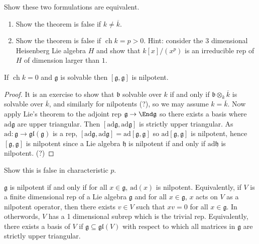 \documentclass[a4paper]{article}
\newcommand*{\Lie}[1]{\mathfrak{#1}} %
\newcommand{\ad}{\mathrm{ad}} %
\DeclareMathOperator{\cha}{ch} %
\begin{document}
\begin{ex}
  Show these two formulations are equivalent.
\end{ex}

\begin{ex}\leavevmode
  \begin{enumerate}
  \item Show the theorem is false if \(k \neq \overline k\).
  \item Show the theorem is false if \(\cha k = p > 0\). Hint: consider the 3 dimensional Heisenberg Lie algebra \(H\) and show that \(k[x]/(x^p)\) is an irreducible rep of \(H\) of dimension larger than \(1\).
  \end{enumerate}
\end{ex}

\begin{corollary}
  If \(\cha k = 0\) and \(\Lie g\) is solvable then \([\Lie g, \Lie g]\) is nilpotent.
\end{corollary}

\begin{proof}
  It is an exercise to show that \(\Lie b\) solvable over \(k\) if and only if \(\Lie b \otimes_k \overline k\) is solvable over \(\overline k\), and similarly for nilpotents (?), so we may assume \(k = \overline k\). Now apply Lie's theorem to the adjoint rep \(\Lie g \to \End \Lie g\) so there exists a basis where \(\ad \Lie g\) are upper triangular. Then \([\ad \Lie g, \ad \Lie g]\) is strictly upper triangular. As \(\ad: \Lie g \to \Lie{gl}(\Lie g)\) is a rep, \([\ad \Lie g, \ad \Lie g] = \ad [\Lie g, \Lie g]\) so \(\ad [\Lie g, \Lie g]\) is nilpotent, hence \([\Lie g, \Lie g]\) is nilpotent since a Lie algebra \(\Lie h\) is nilpotent if and only if \(\ad \Lie h\) is nilpotent. (?)
\end{proof}

\begin{ex}
  Show this is false in characteristic \(p\).
\end{ex}

\begin{theorem}[Engel]
  \(\Lie g\) is nilpotent if and only if for all \(x \in \Lie g\), \(\ad(x)\) is nilpotent. Equivalently, if \(V\) is a finite dimensional rep of a Lie algebra \(\Lie g\) and for all \(x \in \Lie g\), \(x\) acts on \(V\) as a nilpotent operator, then there exists \(v \in V\) such that \(xv = 0\) for all \(x \in \Lie g\). In otherwords, \(V\) has a 1 dimensional subrep which is the trivial rep. Equivalently, there exists a basis of \(V\) if \(\Lie g \subseteq \Lie{gl}(V)\) with respect to which all matrices in \(\Lie g\) are strictly upper triangular.
\end{theorem}
\end{document}
